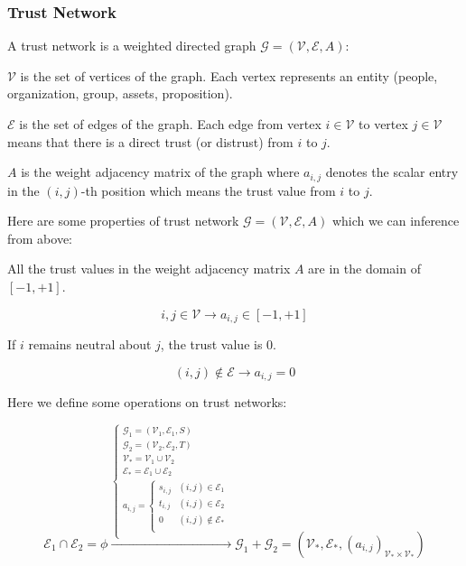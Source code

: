 \documentclass{article}
\begin{document}
\subsubsection{Trust Network}

A trust network is a weighted directed graph \(\mathcal{G}=(\mathcal{V},\mathcal{E},A)\):

\(\mathcal{V}\) is the set of vertices of the graph. Each vertex represents an entity (people, organization, group, assets, proposition).

\(\mathcal{E}\) is the set of edges of the graph. Each edge from vertex \(i\in \mathcal{V}\) to vertex \(j\in \mathcal{V}\) means that there is a
direct trust (or distrust) from \(i\) to \(j\).

\(A\) is the weight adjacency matrix of the graph where \(a_{i,j}\) denotes the scalar entry in the \((i,j)\)-th position which means the trust value
from \(i\) to \(j\).

Here are some properties of trust network \(\mathcal{G}=(\mathcal{V},\mathcal{E},A)\) which we can inference from above:

All the trust values in the weight adjacency matrix \(A\) are in the domain of \([-1,+1]\).

\begin{equation}
i,j\in \mathcal{V}\to a_{i,j}\in [-1,+1]
\end{equation}

If \(i\) remains neutral about \(j\), the trust value is \(0\).

\begin{equation}
(i,j)\notin \mathcal{E}\to a_{i,j}=0
\end{equation}

Here we define some operations on trust networks:

\begin{equation}
\mathcal{E}_1\cap \mathcal{E}_2=\phi \overset{\left\{
\begin{array}{c}
 \mathcal{G}_1=\left(\mathcal{V}_1,\mathcal{E}_1,S\right) \\
 \mathcal{G}_2=\left(\mathcal{V}_2,\mathcal{E}_2,T\right) \\
 \mathcal{V}_*=\mathcal{V}_1\cup \mathcal{V}_2 \\
 \mathcal{E}_*=\mathcal{E}_1\cup \mathcal{E}_2 \\
 a_{i,j}=\left\{
\begin{array}{cc}
 s_{i,j} & (i,j)\in \mathcal{E}_1 \\
 t_{i,j} & (i,j)\in \mathcal{E}_2 \\
 0 & (i,j)\notin \mathcal{E}_* \\
\end{array}
\right. \\
\end{array}
\right.}{\to }\mathcal{G}_1+\mathcal{G}_2=\left(\mathcal{V}_*,\mathcal{E}_*,\left(a_{i,j}\right)_{\mathcal{V}_*\times \mathcal{V}_*}\right)
\end{equation}
\end{document}
